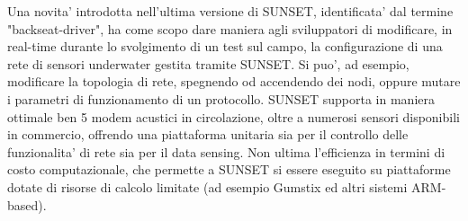 Una novita' introdotta nell'ultima versione di SUNSET, identificata' dal termine "backseat-driver", ha come scopo dare maniera agli sviluppatori di modificare, in real-time durante lo svolgimento di un test sul campo, la configurazione di una rete di sensori underwater gestita tramite SUNSET. Si puo', ad esempio, modificare la topologia di rete, spegnendo od accendendo dei nodi, oppure mutare i parametri di funzionamento di un protocollo.
\newline
SUNSET supporta in maniera ottimale ben 5 modem acustici in circolazione, oltre a numerosi sensori disponibili in commercio, offrendo una piattaforma unitaria sia per il controllo delle funzionalita' di rete sia per il data sensing. Non ultima l'efficienza in termini di costo computazionale, che permette a SUNSET si essere eseguito su piattaforme dotate di risorse di calcolo limitate (ad esempio Gumstix ed altri sistemi ARM-based).

